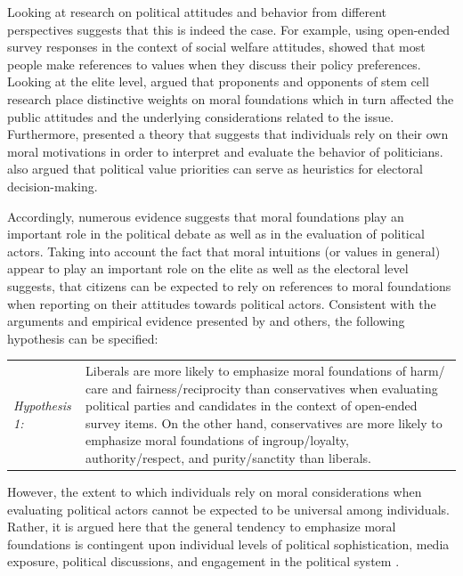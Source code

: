 \documentclass[12pt]{article}
\begin{document}
Looking at research on political attitudes and behavior from different perspectives suggests that this is indeed the case. For example, using open-ended survey responses in the context of social welfare attitudes, \citet{feldman1992political} showed that most people make references to values when they discuss their policy preferences. Looking at the elite level, \citet{clifford2013words} argued that proponents and opponents of stem cell research place distinctive weights on moral foundations which in turn affected the public attitudes and the underlying considerations related to the issue. Furthermore, \citet{clifford2014linking} presented a theory that suggests that individuals rely on their own moral motivations in order to interpret and evaluate the behavior of politicians. \citet{marietta2007values} also argued that political value priorities can serve as heuristics for electoral decision-making.

Accordingly, numerous evidence suggests that moral foundations play an important role in the political debate as well as in the evaluation of political actors. Taking into account the fact that moral intuitions (or values in general) appear to play an important role on the elite as well as the electoral level suggests, that citizens can be expected to rely on references to moral foundations when reporting on their attitudes towards political actors. Consistent with the arguments and empirical evidence presented by \citet{graham2009liberals} and others, the following hypothesis can be specified:

\vspace{0.3cm}
\begin{tabular}{lp{12cm}}
\textsl{Hypothesis 1:} & Liberals are more likely to emphasize moral foundations of harm/ care and fairness/reciprocity  than conservatives when evaluating political parties and candidates in the context of open-ended survey items. On the other hand, conservatives are more likely to emphasize moral foundations of ingroup/loyalty, authority/respect, and purity/sanctity than liberals.
\end{tabular}
\vspace{0.5cm}

However, the extent to which individuals rely on moral considerations when evaluating political actors cannot be expected to be universal among individuals. Rather, it is argued here that the general tendency to emphasize moral foundations is contingent upon individual levels of political sophistication, media exposure, political discussions, and engagement in the political system \citep[see also][]{goren2001core,goren2004political}.
\end{document}
